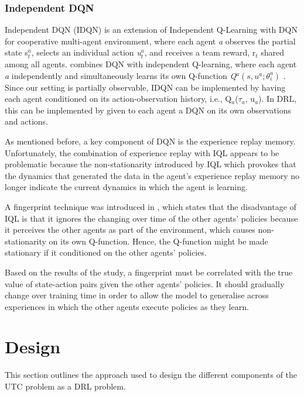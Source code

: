\documentclass{llncs}
\begin{document}
\subsubsection{Independent DQN}

Independent DQN (IDQN) is an extension of Independent Q-Learning\cite{Tan1993} with DQN for cooperative multi-agent environment, where each agent \textit{a} observes the partial state s$_{t}^{a}$, selects an individual action \textit{u$_{t}^{a}$}, and receives a team reward, r$_{t}$ shared among all agents. \cite{Tampuu2015} combines DQN with independent Q-learning, where each agent \textit{a} independently and simultaneously learns its own Q-function \textit{Q$^{a}(s, u^{a};\theta^{a}_{i})$} \cite{DBLP:journals/corr/FoersterAFW16a}. Since our setting is partially observable, IDQN can be implemented by having each agent conditioned on its action-observation history, i.e., Q$_{a}$($\tau_{a}$, u$_{a}$). In DRL, this can be implemented by given to each agent a DQN on its own observations and actions.

As mentioned before, a key component of DQN is the experience replay memory.  Unfortunately, the combination of experience replay with IQL appears to be problematic because the non-stationarity introduced by IQL which provokes that the dynamics that generated the data in the agent's experience replay memory no longer indicate the current dynamics in which the agent is learning.

A fingerprint technique was introduced in \cite{Foerster2017}, which states that the disadvantage of IQL is that it ignores the changing over time of the other agents' policies because it perceives the other agents as part of the environment, which causes non-stationarity on its own Q-function. Hence, the Q-function might be made stationary if it conditioned on the other agents' policies.

Based on the results of the study, a fingerprint must be correlated with the true value of state-action pairs given the other agents' policies. It should gradually change over training time in order to allow the model to generalise across experiences in which the other agents execute policies as they learn.

\section{Design}

This section outlines the approach used to design the different components of the UTC problem as a DRL problem.
\end{document}
